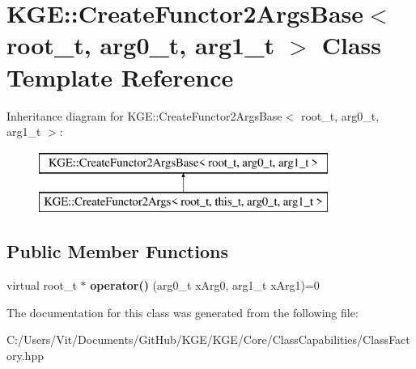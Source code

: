 \hypertarget{class_k_g_e_1_1_create_functor2_args_base}{\section{K\-G\-E\-:\-:Create\-Functor2\-Args\-Base$<$ root\-\_\-t, arg0\-\_\-t, arg1\-\_\-t $>$ Class Template Reference}
\label{class_k_g_e_1_1_create_functor2_args_base}
}
Inheritance diagram for K\-G\-E\-:\-:Create\-Functor2\-Args\-Base$<$ root\-\_\-t, arg0\-\_\-t, arg1\-\_\-t $>$\-:\begin{figure}[H]
\begin{center}
\leavevmode
\includegraphics[height=2.000000cm]{class_k_g_e_1_1_create_functor2_args_base}
\end{center}
\end{figure}
\subsection*{Public Member Functions}
\begin{DoxyCompactItemize}
\item 
\hypertarget{class_k_g_e_1_1_create_functor2_args_base_a76c17555b2b35eedeb6ff56bf021e82f}{virtual root\-\_\-t $\ast$ {\bfseries operator()} (arg0\-\_\-t x\-Arg0, arg1\-\_\-t x\-Arg1)=0}\label{class_k_g_e_1_1_create_functor2_args_base_a76c17555b2b35eedeb6ff56bf021e82f}

\end{DoxyCompactItemize}


The documentation for this class was generated from the following file\-:\begin{DoxyCompactItemize}
\item 
C\-:/\-Users/\-Vit/\-Documents/\-Git\-Hub/\-K\-G\-E/\-K\-G\-E/\-Core/\-Class\-Capabilities/Class\-Factory.\-hpp\end{DoxyCompactItemize}
